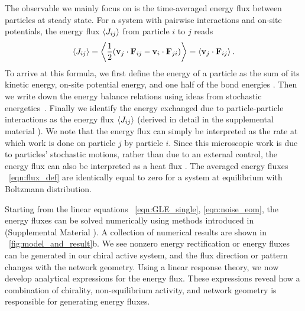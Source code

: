 \documentclass[
 preprint,
 preprintnumbers,
 amsmath,amssymb,
 aps,
 pre,
 longbibliography,
 superscriptaddress,
 10pt, twocolumn
]{revtex4-1}
\begin{document}
The observable we mainly focus on is the time-averaged energy flux between particles at steady state. For a system with pairwise interactions and on-site potentials, the energy flux $\expval{J_{ij}}$ from particle $i$ to $j$ reads
\begin{equation} \label{eqn:flux_def}
    \expval{J_{ij}} = \expval{\frac{1}{2} (\mathbf{v}_j \cdot \mathbf{F}_{ij} - \mathbf{v}_i \cdot \mathbf{F}_{ji})}
    = \expval{\mathbf{v}_j \cdot \mathbf{F}_{ij}}.
\end{equation}
To arrive at this formula, we first define the energy of a particle as the sum of its kinetic energy, on-site potential energy, and one half of the bond energies \cite{Lepri2003ThermalConduction}. Then we write down the energy balance relations using ideas from stochastic energetics~\cite{Sekimoto1998LangevinEquation}. Finally we identify the energy exchanged due to particle-particle interactions as the energy flux $\expval{J_{ij}}$ (derived in detail in the supplemental material \cite{SupplementalMaterial}).
We note that the energy flux can simply be interpreted as the rate at which work is done on particle $j$ by particle $i$.
Since this microscopic work is due to particles' stochastic motions, rather than due to an external control, the energy flux can also be interpreted as a heat flux \cite{Sekimoto1998LangevinEquation,Lepri2003ThermalConduction}. The averaged energy fluxes \eqnname~\eqref{eqn:flux_def} are identically equal to zero for a system at equilibrium with Boltzmann distribution.

Starting from the linear equations \eqnname~\eqref{eqn:GLE_single}, \eqref{eqn:noise_eom}, the energy fluxes can be solved numerically using methods introduced in \cite{Gardiner2009ItoCalculus,Ceriotti2010ColoredNoiseThermostats} (Supplemental Material \cite{SupplementalMaterial}).
A collection of numerical results are shown in \figurename~\ref{fig:model_and_result}b. We see nonzero energy rectification or energy fluxes can be generated in our chiral active system, and the flux direction or pattern changes with the network geometry.
Using a linear response theory, we now develop analytical expressions for the energy flux. These expressions reveal how a combination of chirality, non-equilibrium activity, and network geometry is responsible for generating energy fluxes.
\end{document}
